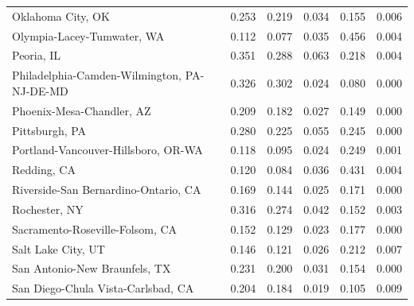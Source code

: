 \documentclass[
  10pt,
]{article}
\begin{document}
\begin{longtable}{lrrrrr}
                           Oklahoma City, OK &              0.253 &              0.219 &                 0.034 &           0.155 &       0.006 \\
                  Olympia-Lacey-Tumwater, WA &              0.112 &              0.077 &                 0.035 &           0.456 &       0.004 \\
                                  Peoria, IL &              0.351 &              0.288 &                 0.063 &           0.218 &       0.004 \\
 Philadelphia-Camden-Wilmington, PA-NJ-DE-MD &              0.326 &              0.302 &                 0.024 &           0.080 &       0.000 \\
                   Phoenix-Mesa-Chandler, AZ &              0.209 &              0.182 &                 0.027 &           0.149 &       0.000 \\
                              Pittsburgh, PA &              0.280 &              0.225 &                 0.055 &           0.245 &       0.000 \\
         Portland-Vancouver-Hillsboro, OR-WA &              0.118 &              0.095 &                 0.024 &           0.249 &       0.001 \\
                                 Redding, CA &              0.120 &              0.084 &                 0.036 &           0.431 &       0.004 \\
        Riverside-San Bernardino-Ontario, CA &              0.169 &              0.144 &                 0.025 &           0.171 &       0.000 \\
                               Rochester, NY &              0.316 &              0.274 &                 0.042 &           0.152 &       0.003 \\
             Sacramento-Roseville-Folsom, CA &              0.152 &              0.129 &                 0.023 &           0.177 &       0.000 \\
                          Salt Lake City, UT &              0.146 &              0.121 &                 0.026 &           0.212 &       0.007 \\
               San Antonio-New Braunfels, TX &              0.231 &              0.200 &                 0.031 &           0.154 &       0.000 \\
          San Diego-Chula Vista-Carlsbad, CA &              0.204 &              0.184 &                 0.019 &           0.105 &       0.009 \\

\end{longtable}
\end{document}
